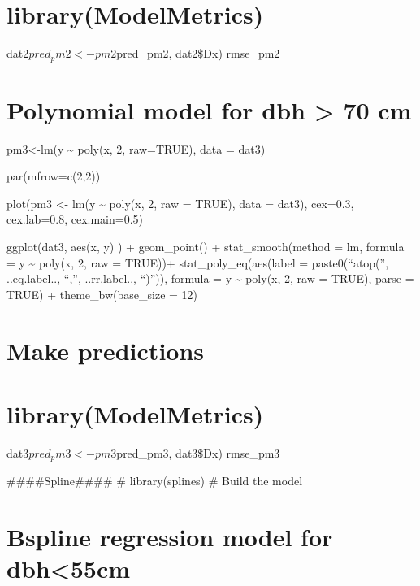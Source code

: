 \documentclass[
]{article}
\begin{document}
\hypertarget{librarymodelmetrics-4}{%
\section{library(ModelMetrics)}\label{librarymodelmetrics-4}}

dat2\(pred_pm2 <- pm2 %
\)pred\_pm2, dat2\$Dx) rmse\_pm2

\hypertarget{polynomial-model-for-dbh-70-cm}{%
\section{Polynomial model for dbh \textgreater{} 70
cm}\label{polynomial-model-for-dbh-70-cm}}

pm3\textless-lm(y \textasciitilde{} poly(x, 2, raw=TRUE), data = dat3)

par(mfrow=c(2,2))

plot(pm3 \textless- lm(y \textasciitilde{} poly(x, 2, raw = TRUE), data
= dat3), cex=0.3, cex.lab=0.8, cex.main=0.5)

ggplot(dat3, aes(x, y) ) + geom\_point() + stat\_smooth(method = lm,
formula = y \textasciitilde{} poly(x, 2, raw = TRUE))+
stat\_poly\_eq(aes(label = paste0(``atop('', ..eq.label.., ``,'',
..rr.label.., ``)'')), formula = y \textasciitilde{} poly(x, 2, raw =
TRUE), parse = TRUE) + theme\_bw(base\_size = 12)

\hypertarget{make-predictions-5}{%
\section{Make predictions}\label{make-predictions-5}}

\hypertarget{librarymodelmetrics-5}{%
\section{library(ModelMetrics)}\label{librarymodelmetrics-5}}

dat3\(pred_pm3 <- pm3 %
\)pred\_pm3, dat3\$Dx) rmse\_pm3

\#\#\#\#Spline\#\#\#\# \# library(splines) \# Build the model

\hypertarget{bspline-regression-model-for-dbh55cm}{%
\section{Bspline regression model for
dbh\textless55cm}\label{bspline-regression-model-for-dbh55cm}}
\end{document}
